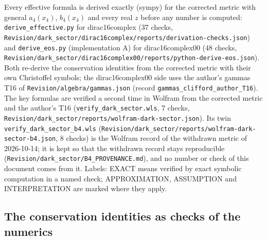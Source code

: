 \documentclass[11pt]{article}
\begin{document}
Every effective formula is derived exactly (sympy) for the corrected metric with general $a_4(x_4)$, $b_4(x_4)$ and every real $z$ before any number is computed: \texttt{derive\_e\allowbreak{}ffective\allowbreak{}.py} for dirac16complex (37 checks, \texttt{Revision\allowbreak{}/dark\_se\allowbreak{}ctor/dir\allowbreak{}ac16comp\allowbreak{}lex/repo\allowbreak{}rts/deri\allowbreak{}vation-c\allowbreak{}hecks.js\allowbreak{}on}) and \texttt{derive\_e\allowbreak{}os.py} (implementation A) for dirac16complex00 (48 checks, \texttt{Revision\allowbreak{}/dark\_se\allowbreak{}ctor/dir\allowbreak{}ac16comp\allowbreak{}lex00/re\allowbreak{}ports/py\allowbreak{}thon-der\allowbreak{}ive-eos.\allowbreak{}json}). Both re-derive the conservation identities from the corrected metric with their own Christoffel symbols; the dirac16complex00 side uses the author's gammas T16 of \texttt{Revision\allowbreak{}/algebra\allowbreak{}/gammas.\allowbreak{}json} (record \texttt{gammas\_c\allowbreak{}lifford\_\allowbreak{}author\_T\allowbreak{}16}). The key formulas are verified a second time in Wolfram from the corrected metric and the author's T16 (\texttt{verify\_d\allowbreak{}ark\_sect\allowbreak{}or.wls}, 7 checks, \texttt{Revision\allowbreak{}/dark\_se\allowbreak{}ctor/rep\allowbreak{}orts/wol\allowbreak{}fram-dar\allowbreak{}k-sector\allowbreak{}.json}). Its twin \texttt{verify\_d\allowbreak{}ark\_sect\allowbreak{}or\_b4.wl\allowbreak{}s} (\texttt{Revision\allowbreak{}/dark\_se\allowbreak{}ctor/rep\allowbreak{}orts/wol\allowbreak{}fram-dar\allowbreak{}k-sector\allowbreak{}-b4.json}, 8 checks) is the Wolfram record of the withdrawn metric of 2026-10-14; it is kept so that the withdrawn record stays reproducible (\texttt{Revision\allowbreak{}/dark\_se\allowbreak{}ctor/B4\_\allowbreak{}PROVENAN\allowbreak{}CE.md}), and no number or check of this document comes from it. Labels: EXACT means verified by exact symbolic computation in a named check; APPROXIMATION, ASSUMPTION and INTERPRETATION are marked where they apply.

\subsection{The conservation identities as checks of the numerics}
\end{document}
